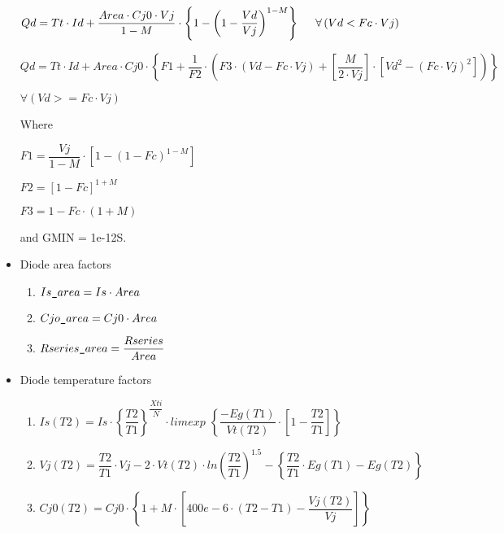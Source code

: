 \begin{itemize}
    \hspace{4mm} $Qd = Tt \cdot Id + \dfrac{Area \cdot Cj0 \cdot Vj}{1-M} \cdot \left\lbrace 1-\left( 1-\dfrac{Vd}{Vj} \right) ^{1-M} \right\rbrace \hspace{5mm} \forall\left( Vd < Fc \cdot Vj\right)$ 


    \hspace{4mm} \begin{small}$Qd = Tt \cdot Id + Area \cdot Cj0 \cdot \left\lbrace F1+\dfrac{1}{F2} \cdot \left( F3 \cdot (Vd-Fc \cdot Vj)+\left[ \dfrac{M}{2 \cdot Vj} \right] \cdot \left[ Vd^{2}-(Fc \cdot Vj)^{2} \right] \right)  \right\rbrace $                                                                                                                                                                                                                                          \end{small}

    \hspace{110mm} $\forall \left( Vd >= Fc \cdot Vj \right) $ 

    \hspace{4mm}Where
 
    \hspace{4mm}$F1=\dfrac{Vj}{1-M} \cdot \left[ 1-\left( 1-Fc\right)^{1-M} \right] $

    \hspace{4mm}$F2=\left[ 1-Fc \right]^{1+M}$

    \hspace{4mm}$F3=1-Fc \cdot \left( 1+M \right) $

    \hspace{4mm} and GMIN = 1e-12S. 

 \item{Diode area factors}
   \begin{enumerate}
    \item $Is\verb|_|area=Is \cdot Area$
    \item $Cjo\verb|_|area=Cj0 \cdot Area$
    \item $Rseries\verb|_|area=\dfrac{Rseries}{Area}$
   \end{enumerate}
\item{Diode temperature factors} 
    \begin{enumerate}
     \item $Is(T2)=Is \cdot \left\lbrace \dfrac{T2}{T1} \right\rbrace^{\dfrac{Xti}{N}} \cdot limexp$ 
          $\left\lbrace \dfrac{-Eg(T1)}{Vt(T2)} \cdot \left[ 1-\dfrac{T2}{T1} \right] \right\rbrace$
     \item $Vj(T2) = \dfrac{T2}{T1} \cdot Vj - 2 \cdot  Vt(T2)  \cdot  ln \left( \dfrac{T2}{T1} \right) ^{1.5} - \left\lbrace \dfrac{T2}{T1} \cdot Eg(T1) - Eg(T2)  \right\rbrace $
     \item $Cj0(T2)=Cj0 \cdot \left\lbrace 1+M \cdot \left[ 400e-6  \cdot \left( T2-T1 \right) -\dfrac{Vj(T2)}{Vj} \right] \right\rbrace   $


\end{enumerate}
\end{itemize}
